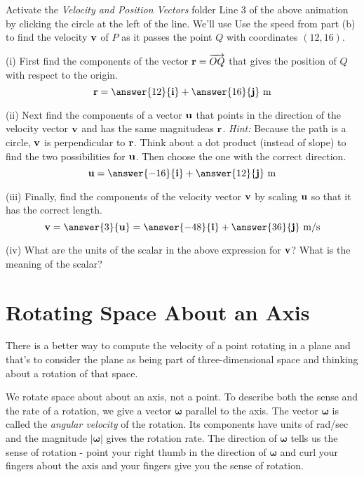 \documentclass{ximera}
\begin{document}
\begin{question}   \label{Q3456457l:Cross}
Activate the {\it Velocity and Position Vectors} folder Line 3 of the above animation by clicking the circle at the left of the line. We'll use Use the speed from part (b) to find the velocity ${\bf v}$ of $P$ as it passes the point $Q$ with coordinates $(12,16)$.

(i) First find the components of the vector ${\bf r}=\overrightarrow{OQ}$ that gives the position of $Q$ with respect to the origin.
\[
    {\bf r} = \answer{12}{\bf i} + \answer{16}{\bf j} \text{ m}
\]

(ii) Next find the components of a vector ${\bf u}$ that points in the direction of the velocity vector ${\bf v}$ and has the same magnitudeas ${\bf r}$. {\it Hint:} Because the path is a circle, ${\bf v}$ is perpendicular to ${\bf r}$. Think about a dot product (instead of slope) to find the two possibilities for ${\bf u}$. Then choose the one with the correct direction.
\[
    {\bf u} =  \answer{-16}{\bf i} + \answer{12}{\bf j} \text{ m}
\]

(iii) Finally, find the components of the velocity vector ${\bf v}$ by scaling ${\bf u}$ so that it has the correct length.
\[
     {\bf v} = \answer{3} {\bf u} = \answer{-48}{\bf i} + \answer{36}{\bf j} \text{ m/s}
\]

(iv) What are the units of the scalar in the above expression for ${\bf v}$? What is the meaning of the scalar?

\end{question}  


 

\section{Rotating Space About an Axis}
There is a better way to compute the velocity of a point rotating in a plane and that's to consider the plane as being part of three-dimensional space and thinking about a rotation of that space.

We rotate space about about an axis, not a point. To describe both the sense and the rate of a rotation, we give a vector $\boldsymbol{\omega}$ parallel to the axis. The vector $\boldsymbol{\omega}$ is called the \emph{angular velocity} of the rotation. Its components have units of rad/sec and the magnitude $|\boldsymbol{\omega}|$ gives the rotation rate. The direction of $\boldsymbol{\omega}$ tells us the sense of rotation - point your right thumb in the direction of $\boldsymbol{\omega}$ and curl your fingers about the axis and your fingers give you the sense of rotation.
\end{document}
